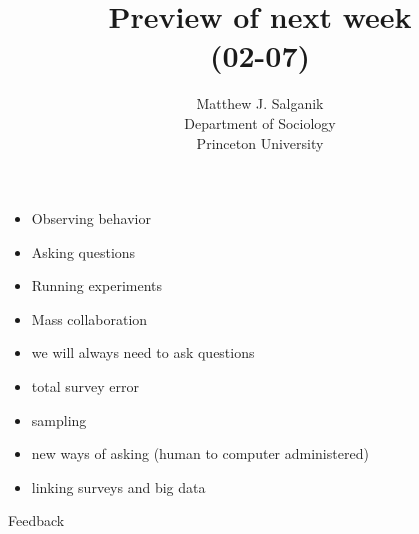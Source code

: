 \documentclass[aspectratio=169]{beamer}
\title[]{Preview of next week\\(02-07)}
\author[]{Matthew J. Salganik\\Department of Sociology\\Princeton University}
\date[]{Soc 596: Computational Social Science\\Fall 2016
\vfill
\begin{flushright}
\vspace{0.6in}
\texttt{[image: figures/cc.png]}
\end{flushright}
}
\begin{document}
\frame{\titlepage}
\begin{frame}

\begin{itemize}
\item Observing behavior
\item Asking questions
\item Running experiments
\item Mass collaboration
\end{itemize}

\end{frame}
\begin{frame}

\begin{itemize}
\item we will always need to ask questions
\item total survey error
\item sampling
\item new ways of asking (human to computer administered)
\item linking surveys and big data
\end{itemize}

\end{frame}
\begin{frame}

\begin{center}
\Large{
Feedback
}
\end{center}

\end{frame}
\end{document}
